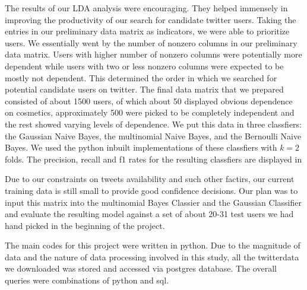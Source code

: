 \documentclass[11pt]{article}
\begin{document}
The results of our LDA analysis were encouraging. They helped immensely in improving 
the productivity of our search for candidate twitter users. Taking the entries in our preliminary
data matrix as indicators, we were able to prioritize users. We essentially went by the 
number of nonzero columns in our preliminary data matrix. Users with higher number of nonzero
columns were potentially more dependent while users with two or less nonzero columns were
expected to be mostly not dependent. This determined the order in which  we searched for
potential candidate users on twitter. The final data matrix that we prepared consisted of 
about 1500 users, of which about 50 displayed obvious dependence on cosmetics, approximately 500 were picked
to be completely independent and the rest showed varying levels of dependence. We put this
data in three classfiers: the Gaussian Naive Bayes, the multinomial Naive Bayes, and the Bernoulli
Naive Bayes. We used the python inbuilt implementations of these classfiers with $k=2$ folds.
The precision, recall and f1 rates for the resulting classfiers are displayed in 




Due to our constraints on tweets
availability and such other factirs, our current training data is still small to provide good
confidence decisions. Our plan was to input this matrix into the multinomial Bayes Classier
and the Gaussian Classifier and evaluate the resulting model against a set of about 20-31 test users
we had hand picked in the beginning of the project.



The main codes for this project were written in python. Due to the magnitude of data and the nature of data processing 
involved in this study, all the twitterdata we downloaded was stored and accessed via postgres database. The overall queries
were combinations of python and sql. 






 
\end{document}
